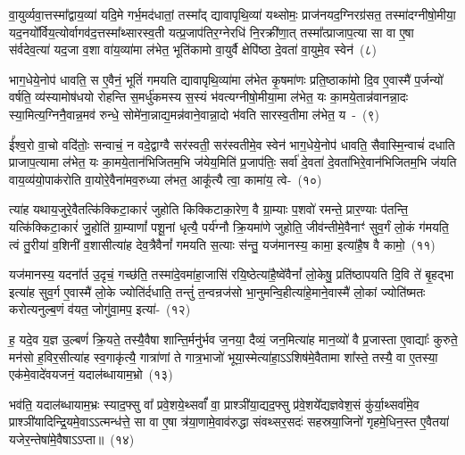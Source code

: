 वा॒युर्व्यवा॒त्तस्मा᳚द्\-वाय॒व्या॑ यदि॒मे गर्भ॒मद॑धातां॒ तस्मा᳚द् द्यावा\-पृथि॒व्या॑ यथ्सोमः॒ प्राज॑नयद॒ग्निरग्र॑सत॒ तस्मा॑दग्नीषो॒मीया॒ यद॒नयो᳚र्विय॒त्योर्वागव॑द॒त्तस्मा᳚थ्सारस्व॒ती यत्प्र॒जा\-प॑तिर॒ग्नेरधि॑ नि॒र\-क्री॑णा॒त् तस्मा᳚त्प्राजाप॒त्या सा वा ए॒षा स॑र्वदेव॒त्या॑ यद॒जा व॒शा वा॑य॒व्या॑मा ल॑भेत॒ भूति॑कामो वा॒युर्वै क्षेपि॑ष्ठा दे॒वता॑ वा॒युमे॒व स्वेन॑~(८)\ip

भाग॒\-धेये॒नोप॑ धावति॒ स ए॒वैनं॒ भूतिं॑ गमयति द्यावा\-पृथि॒व्या॑मा ल॑भेत कृ॒षमा॑णः प्रति॒ष्ठाका॑मो दि॒व ए॒वास्मै॑ प॒र्जन्यो॑ वर्\mbox{}षति॒ व्य॑स्यामोष॑धयो रोहन्ति स॒मर्धु॑कमस्य स॒स्यं भ॑वत्यग्नीषो॒मीया॒मा ल॑भेत॒ यः का॒मये॒तान्न॑वानन्ना॒दः स्या॒मित्य॒ग्निनै॒वान्न॒मव॑ रुन्धे॒ सोमे॑ना॒न्नाद्य॒मन्न॑वाने॒वान्ना॒दो भ॑वति सारस्व॒तीमा ल॑भेत॒ य~-~(९)\ip

ई᳚श्व॒रो वा॒चो वदि॑तोः॒ सन्वाचं॒ न वदे॒द्वाग्वै सर॑स्वती॒ सर॑स्वतीमे॒व स्वेन॑ भाग॒\-धेये॒नोप॑ धावति॒ सैवास्मि॒न्वाचं॑ दधाति प्राजाप॒त्यामा ल॑भेत॒ यः का॒मये॒तान॑भिजितम॒भि ज॑येय॒मिति॑ प्र॒जा\-प॑तिः॒ सर्वा॑ दे॒वता॑ दे॒वता॑भिरे॒वान॑भि\-जितम॒भि ज॑यति वाय॒व्य॑यो॒पा\-क॑रोति वा॒योरे॒वैना॑मव॒रुध्या ल॑भत॒ आकू᳚त्यै त्वा॒ कामा॑य॒ त्वे-~(१०)\ip

त्या॑ह यथाय॒जुरे॒वैतत्कि॑क्किटा॒कारं॑ जुहोति किक्किटाका॒रेण॒ वै ग्रा॒म्याः प॒शवो॑ रमन्ते॒ प्रार॒ण्याः प॑तन्ति॒ यत्कि॑क्किटा॒कारं॑ जु॒होति॑ ग्रा॒म्याणां᳚ पशू॒नां धृत्यै॒ पर्य॑ग्नौ क्रि॒यमा॑णे जुहोति॒ जीव॑न्तीमे॒वैनाꣳ॑ सुव॒र्गं लो॒कं ग॑मयति॒ त्वं तु॒रीया॑ व॒शिनी॑ व॒शासीत्या॑ह देव॒त्रैवैनां᳚ गमयति स॒त्याः स॑न्तु॒ यज॑मानस्य॒ कामा॒ इत्या॑है॒ष वै कामो॒~(११)\ip

यज॑मानस्य॒ यदना᳚र्त उ॒दृचं॒ गच्छ॑ति॒ तस्मा॑दे॒वमा॑हा॒जासि॑ रयि॒ष्ठेत्या॑है॒ष्वे॑वैनां᳚ लो॒केषु॒ प्रति॑\-ष्ठापयति दि॒वि ते॑ बृ॒हद्भा इत्या॑ह सुव॒र्ग ए॒वास्मै॑ लो॒के ज्योति॑र्दधाति॒ तन्तुं॑ त॒न्वन्रज॑सो भा॒नुमन्वि॒ही\-त्या॑\-हे॒माने॒वास्मै॑ लो॒कां ज्योति॑ष्मतः करोत्यनुल्ब॒णं व॑यत॒ जोगु॑वा॒मप॒ इत्या॑-~(१२)\ip

ह॒ यदे॒व य॒ज्ञ उ॒ल्बणं॑ क्रि॒यते॒ तस्यै॒वैषा शान्ति॒र्मनु॑र्भव ज॒नया॒ दैव्यं॒ जन॒मित्या॑ह मान॒व्यो॑ वै प्र॒जास्ता ए॒वाद्याः᳚ कुरुते॒ मन॑सो ह॒विर॒सीत्या॑ह स्व॒गाकृ॑त्यै॒ गात्रा॑णां ते गात्र॒भाजो॑ भूया॒स्मेत्या॑हा॒\-ऽऽ\-\-शिष॑मे॒वैतामा शा᳚स्ते॒ तस्यै॒ वा ए॒तस्या॒ एक॑मे॒वादे॑वयजनं॒ यदाल॑ब्धायाम॒भ्रो~(१३)\ip

भव॑ति॒ यदाल॑ब्धायाम॒भ्रः स्याद॒फ्सु वा᳚ प्रवे॒शये॒थ्सर्वां᳚ वा॒ प्राश्ञी॑या॒द्यद॒फ्सु प्र॑वे॒शये᳚द्यज्ञवेश॒सं कु॑र्या॒थ्सर्वा॑मे॒व प्राश्ञी॑या\-दिन्द्रि॒य\-मे॒वा\-ऽऽ\-त्मन्ध॑त्ते॒ सा वा ए॒षा त्र॑या॒णामे॒वाव॑रुद्धा संवथ्सर॒सदः॑ सहस्रया॒जिनो॑ गृहमे॒धिन॒स्त ए॒वैतया॑ यजेर॒न्तेषा॑\-मे॒वै\-षा\-ऽऽ\-प्ता॥~(१४)\ip


